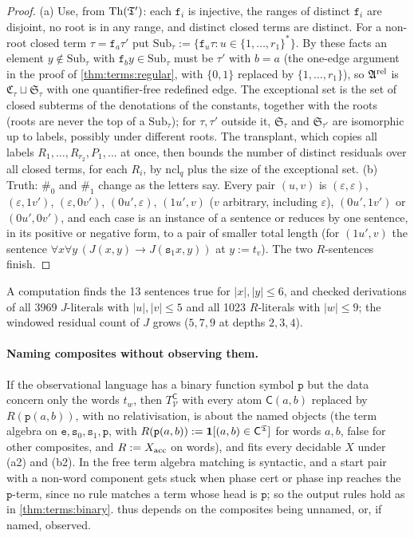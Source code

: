 \begin{proof}
(a) Use, from $\mathrm{Th}(\mathfrak T')$: each $\mathtt f_i$ is injective, the ranges of distinct $\mathtt f_i$ are disjoint, no root is in any range, and distinct closed terms are distinct. For a non-root closed term $\tau=\mathtt f_a\tau'$ put $\mathrm{Sub}_\tau:=\{\mathtt f_u\tau:u\in\{1,\dots,r_1\}^*\}$. By these facts an element $y\notin\mathrm{Sub}_\tau$ with $\mathtt f_by\in\mathrm{Sub}_\tau$ must be $\tau'$ with $b=a$ (the one-edge argument in the proof of \cref{thm:terms:regular}, with $\{0,1\}$ replaced by $\{1,\dots,r_1\}$), so $\mathfrak A^{\rm rel}$ is $\mathfrak C_\tau\sqcup\mathfrak S_\tau$ with one quantifier-free redefined edge. The exceptional set is the set of closed subterms of the denotations of the constants, together with the roots (roots are never the top of a $\mathrm{Sub}_\tau$); for $\tau,\tau'$ outside it, $\mathfrak S_\tau$ and $\mathfrak S_{\tau'}$ are isomorphic up to labels, possibly under different roots. The transplant, which copies all labels $R_1,\dots,R_{r_2},P_1,\dots$ at once, then bounds the number of distinct residuals over all closed terms, for each $R_i$, by $\mathrm{ncl}_q$ plus the size of the exceptional set.
(b) Truth: $\#_0$ and $\#_1$ change as the letters say. Every pair $(u,v)$ is $(\varepsilon,\varepsilon)$, $(\varepsilon,1v')$, $(\varepsilon,0v')$, $(0u',\varepsilon)$, $(1u',v)$ ($v$ arbitrary, including $\varepsilon$), $(0u',1v')$ or $(0u',0v')$, and each case is an instance of a sentence or reduces by one sentence, in its positive or negative form, to a pair of smaller total length (for $(1u',v)$ the sentence $\forall x\forall y\,(J(x,y)\to J(\mathtt s_1x,y))$ at $y:=t_v$). The two $R$-sentences finish.
\end{proof}

A computation finds the 13 sentences true for $\lvert x\rvert,\lvert y\rvert\le6$, and checked derivations of all 3969 $J$-literals with $\lvert u\rvert,\lvert v\rvert\le5$ and all 1023 $R$-literals with $\lvert w\rvert\le9$; the windowed residual count of $J$ grows ($5,7,9$ at depths $2,3,4$).

\paragraph{Naming composites without observing them.} If the observational language has a binary function symbol $\mathtt p$ but the data concern only the words $t_w$, then $T^{\mathsf C}_{\mathcal V}$ with every atom $\mathsf C(a,b)$ replaced by $R(\mathtt p(a,b))$, with no relativisation, is about the named objects (the term algebra on $\mathtt e,\mathtt s_0,\mathtt s_1,\mathtt p$, with $R(\mathtt p(a,b)):=\mathbf{1}[(a,b)\in\mathsf C^{\mathfrak T}]$ for words $a,b$, false for other composites, and $R:=X_{\rm acc}$ on words), and fits every decidable $X$ under (a2) and (b2). In the free term algebra matching is syntactic, and a start pair with a non-word component gets stuck when phase cert or phase inp reaches the $\mathtt p$-term, since no rule matches a term whose head is $\mathtt p$; so the output rules hold as in \cref{thm:terms:binary}.  thus depends on the composites being unnamed, or, if named, observed.

